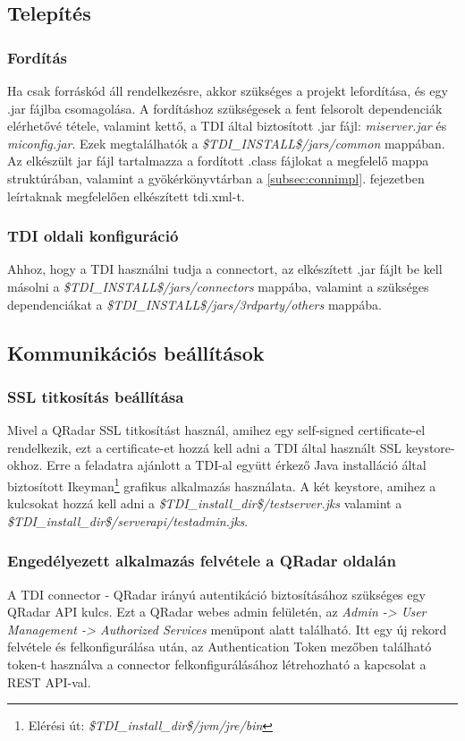 \subsection{Telepítés}

\subsubsection{Fordítás}
Ha csak forráskód áll rendelkezésre, akkor szükséges a projekt lefordítása, és egy .jar fájlba csomagolása. A fordításhoz szükségesek a fent felsorolt dependenciák elérhetővé tétele, valamint kettő, a TDI által biztosított .jar fájl: \textit{miserver.jar} és \textit{miconfig.jar}. Ezek megtalálhatók a \textit{\$TDI\_INSTALL\$/jars/common} mappában. 
Az elkészült jar fájl tartalmazza a fordított .class fájlokat a megfelelő mappa struktúrában, valamint a gyökérkönyvtárban a \ref{subsec:connimpl}. fejezetben leírtaknak megfelelően elkészített tdi.xml-t.

\subsubsection{TDI oldali konfiguráció}
Ahhoz, hogy a TDI használni tudja a connectort, az elkészített .jar fájlt be kell másolni a \textit{\$TDI\_INSTALL\$/jars/connectors} mappába, valamint a szükséges dependenciákat a \textit{\$TDI\_INSTALL\$/jars/3rdparty/others} mappába.
\subsection{Kommunikációs beállítások}

\subsubsection{SSL titkosítás beállítása}
Mivel a QRadar SSL titkosítást használ, amihez egy self-signed certificate-el rendelkezik, ezt a certificate-et hozzá kell adni a TDI által használt SSL keystore-okhoz. Erre a feladatra ajánlott a TDI-al együtt érkező Java installáció által biztosított Ikeyman\footnote{Elérési út: \textit{\$TDI\_install\_dir\$/jvm/jre/bin}} grafikus alkalmazás használata. A két keystore, amihez a kulcsokat hozzá kell adni a \textit{\$TDI\_install\_dir\$/testserver.jks} valamint a \textit{\$TDI\_install\_dir\$/serverapi/testadmin.jks}.\cite{qradarssl}

\subsubsection{Engedélyezett alkalmazás felvétele a QRadar oldalán }
A TDI connector - QRadar irányú autentikáció biztosításához szükséges egy QRadar API kulcs. Ezt a QRadar webes admin felületén, az \textit{Admin -> User Management -> Authorized Services} menüpont alatt található. Itt egy új rekord felvétele és felkonfigurálása után, az Authentication Token mezőben található token-t használva a connector felkonfigurálásához létrehozható a kapcsolat a REST API-val. 

